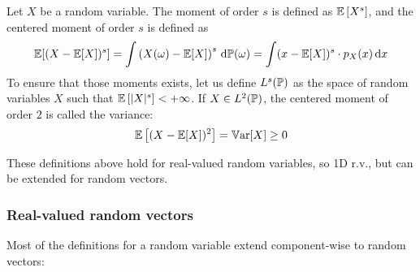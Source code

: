 \documentclass[../../Main_ManuscritThese.tex]{subfiles}
\begin{document}
\begin{definition}
  Let $X$ be a random variable.  The moment of order $s$ is defined as
  $\mathbb{E}\left[X^s\right]$, and the centered moment of order $s$ is
  defined as
  \begin{equation}
    \mathbb{E}[(X-\mathbb{E}[X])^s]=\int \left(X(\omega) - \mathbb{E}[X]\right)^s \,\mathrm{d}\mathbb{P}(\omega) = \int (x-\mathbb{E}[X])^s\cdot p_X(x)\,\mathrm{d}x
  \end{equation}
  To ensure that those moments exists, let us define $L^s(\mathbb{P})$ as
  the space of random variables $X$ such that
  $\mathbb{E}\left[\lvert X \rvert^s\right] < +\infty$.  If
  $X\in L^2(\mathbb{P})$, the centered moment of order $2$ is called the
  variance:
  \begin{equation}
    \label{eq:variance_def}
    \mathbb{E}\left[(X-\mathbb{E}[X])^2 \right] = \mathbb{V}\mathrm{ar}[X] \geq 0
  \end{equation}
\end{definition}

These definitions above hold for real-valued random variables, so 1D
r.v., but can be extended for random vectors.

\subsubsection{Real-valued random vectors}
 Most of the definitions for a random variable extend component-wise to random vectors:
\end{document}
